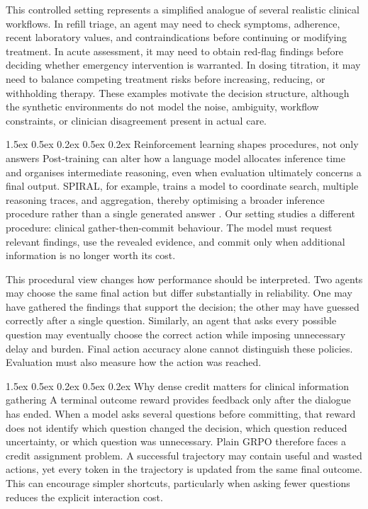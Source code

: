 \documentclass{article}
\makeatletter
\renewcommand{\paragraph}{%
  \@startsection{paragraph}{4}{\z@}%
                {1.5ex \@plus 0.5ex \@minus 0.2ex}%
                {0.5ex \@plus 0.2ex}%
                {\normalsize\bf}}
\makeatother
\begin{document}
This controlled setting represents a simplified analogue of several realistic
clinical workflows. In refill triage, an agent may need to check symptoms,
adherence, recent laboratory values, and contraindications before continuing or
modifying treatment. In acute assessment, it may need to obtain red-flag
findings before deciding whether emergency intervention is warranted. In dosing
titration, it may need to balance competing treatment risks before increasing,
reducing, or withholding therapy. These examples motivate the decision
structure, although the synthetic environments do not model the noise,
ambiguity, workflow constraints, or clinician disagreement present in actual
care.

\paragraph{Reinforcement learning shapes procedures, not only answers}
Post-training can alter how a language model allocates inference time and
organises intermediate reasoning, even when evaluation ultimately concerns a
final output. SPIRAL, for example, trains a model to coordinate search, multiple
reasoning traces, and aggregation, thereby optimising a broader inference
procedure rather than a single generated answer \citep{hamid2026spiral}. Our
setting studies a different procedure: clinical gather-then-commit behaviour.
The model must request relevant findings, use the revealed evidence, and commit
only when additional information is no longer worth its cost.

This procedural view changes how performance should be interpreted. Two agents
may choose the same final action but differ substantially in reliability. One
may have gathered the findings that support the decision; the other may have
guessed correctly after a single question. Similarly, an agent that asks every
possible question may eventually choose the correct action while imposing
unnecessary delay and burden. Final action accuracy alone cannot distinguish
these policies. Evaluation must also measure how the action was reached.

\paragraph{Why dense credit matters for clinical information gathering}
A terminal outcome reward provides feedback only after the dialogue has ended.
When a model asks several questions before committing, that reward does not
identify which question changed the decision, which question reduced
uncertainty, or which question was unnecessary. Plain GRPO therefore faces a
credit assignment problem. A successful trajectory may contain useful and
wasted actions, yet every token in the trajectory is updated from the same final
outcome. This can encourage simpler shortcuts, particularly when asking fewer
questions reduces the explicit interaction cost.
\end{document}
